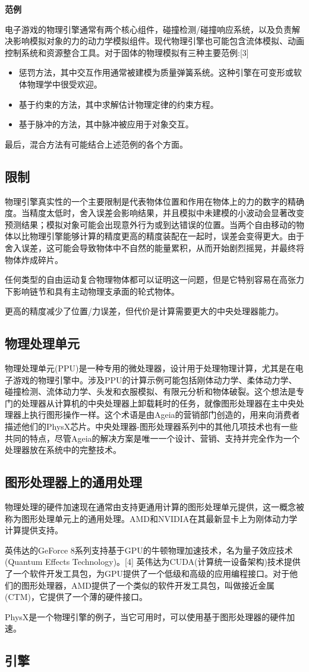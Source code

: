 \textbf{范例}

电子游戏的物理引擎通常有两个核心组件，碰撞检测/碰撞响应系统，以及负责解决影响模拟对象的力的动力学模拟组件。现代物理引擎也可能包含流体模拟、动画控制系统和资源整合工具。对于固体的物理模拟有三种主要范例:[3]
\begin{itemize}
\item 惩罚方法，其中交互作用通常被建模为质量弹簧系统。这种引擎在可变形或软体物理学中很受欢迎。
\item 基于约束的方法，其中求解估计物理定律的约束方程。
\item 基于脉冲的方法，其中脉冲被应用于对象交互。
\end{itemize}

最后，混合方法有可能结合上述范例的各个方面。
\subsection{限制}
物理引擎真实性的一个主要限制是代表物体位置和作用在物体上的力的数字的精确度。当精度太低时，舍入误差会影响结果，并且模拟中未建模的小波动会显著改变预测结果；模拟对象可能会出现意外行为或到达错误的位置。当两个自由移动的物体以比物理引擎能够计算的精度更高的精度装配在一起时，误差会变得更大。由于舍入误差，这可能会导致物体中不自然的能量累积，从而开始剧烈摇晃，并最终将物体炸成碎片。

任何类型的自由运动复合物理物体都可以证明这一问题，但是它特别容易在高张力下影响链节和具有主动物理支承面的轮式物体。

更高的精度减少了位置/力误差，但代价是计算需要更大的中央处理器能力。
\subsection{物理处理单元}
物理处理单元(PPU)是一种专用的微处理器，设计用于处理物理计算，尤其是在电子游戏的物理引擎中。涉及PPU的计算示例可能包括刚体动力学、柔体动力学、碰撞检测、流体动力学、头发和衣服模拟、有限元分析和物体破裂。这个想法是专门的处理器从计算机的中央处理器上卸载耗时的任务，就像图形处理器在主中央处理器上执行图形操作一样。这个术语是由Ageia的营销部门创造的，用来向消费者描述他们的PhysX芯片。中央处理器-图形处理器系列中的其他几项技术也有一些共同的特点，尽管Ageia的解决方案是唯一一个设计、营销、支持并完全作为一个处理器放在系统中的完整技术。
\subsection{图形处理器上的通用处理}
物理处理的硬件加速现在通常由支持更通用计算的图形处理单元提供，这一概念被称为图形处理单元上的通用处理。AMD和NVIDIA在其最新显卡上为刚体动力学计算提供支持。

英伟达的GeForce 8系列支持基于GPU的牛顿物理加速技术，名为量子效应技术(Quantum Effects Technology)。[4] 英伟达为CUDA(计算统一设备架构)技术提供了一个软件开发工具包，为GPU提供了一个低级和高级的应用编程接口。对于他们的图形处理器，AMD提供了一个类似的软件开发工具包，叫做接近金属(CTM)，它提供了一个薄的硬件接口。

PhysX是一个物理引擎的例子，当它可用时，可以使用基于图形处理器的硬件加速。
\subsection{引擎}
\su